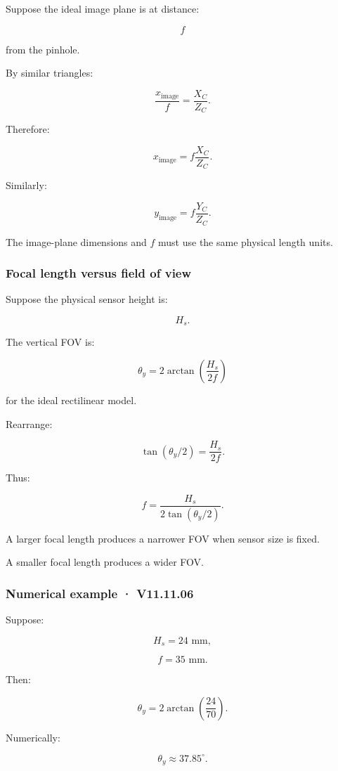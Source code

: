 Suppose the ideal image plane is at distance:

\[
 f
\]

from the pinhole.

By similar triangles:

\[
 \frac{x_{\mathrm{image}}}{f} = \frac{X_C}{Z_C}.
\]

Therefore:

\[
 \boxed{ x_{\mathrm{image}}= f\frac{X_C}{Z_C} }.
\]

Similarly:

\[
 \boxed{ y_{\mathrm{image}}= f\frac{Y_C}{Z_C} }.
\]

The image-plane dimensions and \(f\) must use the same physical length units.

\subsubsection{Focal length versus field of view}\label{focal-length-versus-field-of-view}

Suppose the physical sensor height is:

\[
 H_s.
\]

The vertical FOV is:

\[
 \boxed{ \theta_y= 2\arctan\left(\frac{H_s}{2f}\right) }
\]

for the ideal rectilinear model.

Rearrange:

\[
 \tan(\theta_y/2)=\frac{H_s}{2f}.
\]

Thus:

\[
 \boxed{ f=\frac{H_s}{2\tan(\theta_y/2)} }.
\]

A larger focal length produces a narrower FOV when sensor size is fixed.

A smaller focal length produces a wider FOV.

\subsubsection{Numerical example · V11.11.06}\label{numerical-example-v11.11.06}

Suppose:

\[
 H_s=24\text{ mm},
\]

\[
 f=35\text{ mm}.
\]

Then:

\[
 \theta_y= 2\arctan\left(\frac{24}{70}\right).
\]

Numerically:

\[
 \boxed{ \theta_y\approx37.85^\circ }.
\]

